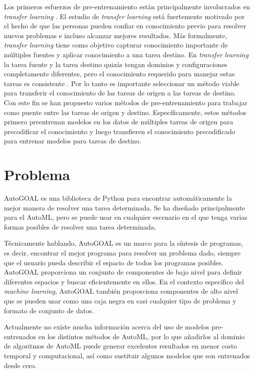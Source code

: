 Los primeros esfuerzos de pre-entrenamiento están principalmente involucrados en \textit{transfer learning} \parencite{9}. El estudio de \textit{transfer learning} está fuertemente motivado por el hecho de que las personas pueden confiar en conocimiento previo para resolver nuevos problemas e incluso alcanzar mejores resultados. Más formalmente, \textit{transfer learning} tiene como objetivo capturar conocimiento importante de múltiples fuentes y aplicar conocimiento a una tarea destino. En \textit{transfer learning} la tarea fuente y la tarea destino quizás tengan dominios y configuraciones completamente diferentes, pero el conocimiento requerido para manejar estas tareas es consistente \parencite{10}. Por lo tanto es importante seleccionar un método viable para transferir el conocimiento de las tareas de origen a las tareas de destino. Con este fin se han propuesto varios métodos de pre-entrenamiento para trabajar como puente entre las tareas de origen y destino. Específicamente, estos métodos primero preentrenan modelos en los datos de múltiples tareas de origen para precodificar el conocimiento y luego transfieren el conocimiento precodificado para entrenar modelos para tareas de destino.

\section*{Problema}
AutoGOAL \parencite{71} es una biblioteca de Python para encontrar automáticamente la mejor manera de resolver una tarea determinada. Se ha diseñado principalmente para el AutoML, pero se puede usar en cualquier escenario en el que tenga varias formas posibles de resolver una tarea determinada.

Técnicamente hablando, AutoGOAL es un marco para la síntesis de programas, es decir, encontrar el mejor programa para resolver un problema dado, siempre que el usuario pueda describir el espacio de todos los programas posibles. AutoGOAL proporciona un conjunto de componentes de bajo nivel para definir diferentes espacios y buscar eficientemente en ellos. En el contexto específico del \textit{machine learning}, AutoGOAL también proporciona componentes de alto nivel que se pueden usar como una caja negra en casi cualquier tipo de problema y formato de conjunto de datos.

Actualmente no existe mucha información acerca del uso de modelos pre-entrenados en los distintos métodos de AutoML, por lo que añadirlos al dominio de algoritmos de AutoML puede generar excelentes resultados en menor costo temporal y computacional, así como sustituir algunos modelos que son entrenados desde cero.

